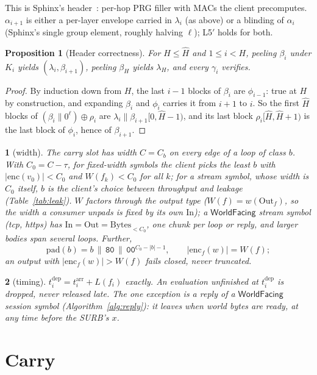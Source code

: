 \documentclass[journal]{IEEEtran}
\newtheorem{proposition}{Proposition}
\newcommand{\namedhead}{}
\newtheorem*{namedenv}{\namedhead}
\newenvironment{lawL}[2]{\renewcommand{\namedhead}{Law #1}%
  \begin{namedenv}[#2]}{\end{namedenv}}
\newcommand{\WF}{\mathsf{WorldFacing}}
\newcommand{\pad}{\mathrm{pad}}
\newcommand{\enc}{\mathrm{enc}}
\newcommand{\In}{\mathrm{In}}
\newcommand{\Out}{\mathrm{Out}}
\newcommand{\arr}{t^{\mathrm{arr}}}
\newcommand{\dep}{t^{\mathrm{dep}}}
\newcommand{\Hm}{\hat H}
\DeclareRobustCommand{\code}[1]{{\ttfamily\renewcommand{\_}{\textunderscore\allowbreak}#1}}
\begin{document}
This is Sphinx's header~\cite{Danezis2009}: per-hop PRG filler with MACs
the client precomputes.  $\alpha_{i+1}$ is either a per-layer envelope
carried in $\lambda_i$ (as above) or a blinding of $\alpha_i$ (Sphinx's
single group element, roughly halving $\ell$); L5$'$ holds for both.

\begin{proposition}[Header correctness]\label{prop:header}
For $H\le\Hm$ and $1\le i<H$, peeling $\beta_i$ under $K_i$ yields
$(\lambda_i,\beta_{i+1})$, peeling $\beta_H$ yields $\lambda_H$, and every
$\gamma_i$ verifies.
\end{proposition}
\begin{proof}
By induction down from $H$, the last $i-1$ blocks of $\beta_i$ are
$\phi_{i-1}$: true at $H$ by construction, and expanding $\beta_i$ and
$\phi_i$ carries it from $i+1$ to $i$.  So the first $\Hm$ blocks of
$(\beta_i\|0^\ell)\oplus\rho_i$ are $\lambda_i\|\beta_{i+1}[0,\Hm{-}1)$,
and its last block $\rho_i[\Hm,\Hm{+}1)$ is the last block of $\phi_i$,
hence of $\beta_{i+1}$.
\end{proof}

\begin{lawL}{L3}{width}
The carry slot has width $C=C_b$ on every edge of a loop of class $b$.
With $C_0=C-\tau$, for fixed-width symbols the client picks the least
$b$ with $|\enc(v_0)|<C_0$ and $W(f_k)<C_0$ for all $k$; for a stream
symbol, whose width is $C_0$ itself, $b$ is the client's choice between
throughput and leakage (Table~\ref{tab:leak}).  $W$ factors through the output type ($W(f)=w(\Out_f)$, so the
width a consumer unpads is fixed by its own $\In$); a $\WF$ stream symbol
(\code{tcp}, \code{https}) has $\In=\Out=\mathrm{Bytes}_{<C_0}$, one chunk
per loop or reply, and larger bodies span several loops.  Further,
\[
\pad(b)=b\,\|\,\mathtt{80}\,\|\,\mathtt{00}^{C_0-|b|-1},\qquad
|\enc_f(w)|=W(f);
\]
an output with $|\enc_f(w)|>W(f)$ fails closed, never truncated.
\end{lawL}

\begin{lawL}{L4}{timing}
$\dep_i=\arr_i+L(f_i)$ exactly.  An evaluation unfinished at $\dep_i$ is
dropped, never released late.  The one exception is a reply of a $\WF$
session symbol (Algorithm~\ref{alg:reply}): it leaves when world bytes are
ready, at any time before the SURB's $x$.
\end{lawL}

\section{Carry}\label{sec:carry}
\end{document}
